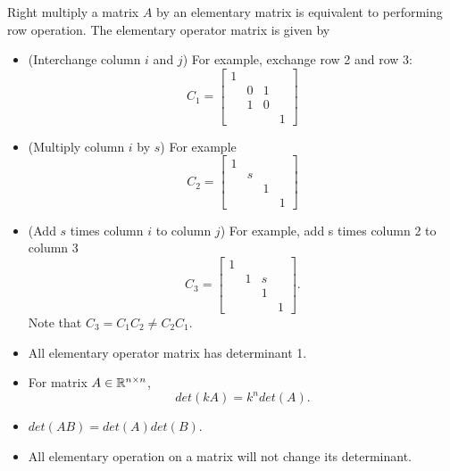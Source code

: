 \begin{refsection}
\begin{lemma} Right multiply a matrix $A$ by an elementary matrix is equivalent to performing row operation. The elementary operator matrix is given by	
	\begin{itemize}
		\item (Interchange column $i$ and $j$) For example, exchange  row 2 and row 3:
		$$C_1=\begin{bmatrix}
		1 &  &  & \\ 
		& 0 & 1 & \\ 
		& 1 & 0 & \\ 
		&  &  & 1
		\end{bmatrix}$$
		\item (Multiply column $i$ by $s$) For example
		$$C_2=\begin{bmatrix}
		1 &  &  & \\ 
		& s &  & \\ 
		&  & 1 & \\ 
		&  &  & 1
		\end{bmatrix}$$
		\item (Add $s$ times column $i$ to column $j$) For example, add s times column 2 to column 3
		$$C_3=\begin{bmatrix}
		1 &  &  & \\ 
		& 1 & s & \\ 
		&  & 1 & \\ 
		&  &  & 1
		\end{bmatrix}.$$
		Note that $C_3 = C_1C_2 \neq C_2C_1.$
	\end{itemize}	
\end{lemma}


\begin{lemma}\label{appendix:th:matrixDeterminantProperties} \hfill
\begin{itemize}
	\item All elementary operator matrix has determinant 1.
	\item For matrix $A\in \mathbb{R}^{n\times n}$, $$det(kA) = k^n det(A).$$
	\item $det(AB) = det(A)det(B)$.
	\item All elementary operation on a matrix will not change its determinant. 
\end{itemize}	
\end{lemma}






\end{refsection}
